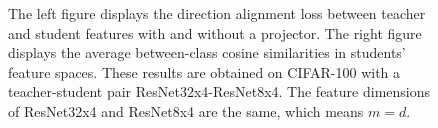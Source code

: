 \documentclass{article}
\begin{document}
\begin{figure}
    \centering
	\hspace{5mm}
	\par
	\caption{The left figure displays the direction alignment loss between teacher and student features with and without a projector. The right figure displays the average between-class cosine similarities in students' feature spaces. These results are obtained on CIFAR-100 with a teacher-student pair ResNet32x4-ResNet8x4. The feature dimensions of ResNet32x4 and ResNet8x4 are the same, which means $m=d$.}
	\label{visualisationofcos}
\end{figure}
\end{document}
